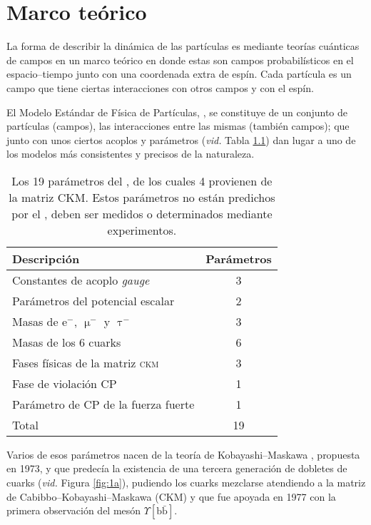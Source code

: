 \chapter{Marco teórico}
\label{cha:theo}



\color{dieg}
\color{vero} La forma de describir la dinámica \color{norm} de las partículas es mediante  teorías cuánticas de campos  en un marco teórico en donde estas son campos probabilísticos en el espacio--tiempo junto con una coordenada extra de espín.
Cada partícula es un campo que tiene ciertas interacciones con otros campos y con el espín.%
\color{norm}


El \color{vero} Modelo Estándar de Física de Partículas, \stdmod, \color{norm} se constituye de un conjunto de partículas (campos), \color{vero}las  interacciones \color{norm} entre las mismas (también campos); que junto con unos ciertos acoplos y parámetros (\emph{vid.} Tabla \ref{tab_stdparams}) dan lugar a uno de los modelos más consistentes y precisos de la naturaleza.

\begin{table}[H]
\centering
\begin{tabular}{lc}
\toprule
Descripción & Parámetros \\ \midrule
Constantes de acoplo \textit{\emph{gauge}} & 3\\
Parámetros del potencial escalar & 2 \\
Masas de $\mathrm{e^-}$, ${\upmu^-}$ y ${\uptau^-}$ & 3 \\
Masas de los 6 cuarks & 6\\
Fases físicas de la matriz  \textsc{ckm}  & 3 \\
Fase de violación CP & 1\\
Parámetro de CP de la fuerza fuerte & 1\\ \midrule
Total & 19\\
\bottomrule
\end{tabular}
\caption{Los 19 parámetros del \stdmod, de los cuales 4 provienen de la matriz CKM. Estos parámetros no están predichos por el \stdmod, deben ser medidos o determinados mediante experimentos.}	\label{tab_stdparams}
\end{table}
%
\color{norm} 
%
%
Varios de esos parámetros nacen de la teoría de Kobayashi--Maskawa \cite{km1}, propuesta en 1973, y que predecía la existencia de una tercera generación de dobletes de cuarks (\emph{vid.} Figura \ref{fig:1a}), pudiendo los cuarks mezclarse atendiendo a la matriz de Cabibbo--Kobayashi--Maskawa (CKM)  y que fue \color{vero} apoyada \color{norm} en 1977 con la primera observación del mesón $\Upsilon [\mathrm{b\bar{b}}]$.
%

